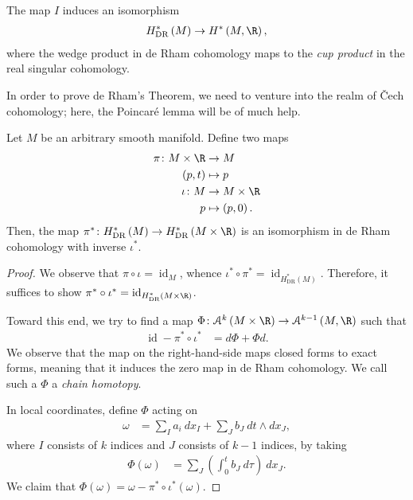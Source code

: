 \documentclass[10pt]{mypackage}
\begin{document}
\begin{theorem}
  The map $I$ induces an isomorphism
  \begin{align*}
    H^{\ast}_{\operatorname{DR}}\left( M \right)\rightarrow H^{\ast}\left( M,\R \right),
  \end{align*}
  where the wedge product in de Rham cohomology maps to the \textit{cup product} in the real singular cohomology.
\end{theorem}
In order to prove de Rham's Theorem, we need to venture into the realm of \v{C}ech cohomology; here, the Poincaré lemma will be of much help.
\begin{theorem}
  Let $M$ be an arbitrary smooth manifold. Define two maps
  \begin{align*}
    \pi\colon M\times \R&\rightarrow M\\
    \left( p,t \right) &\mapsto p\\
    \iota\colon M&\rightarrow M\times \R\\
    p &\mapsto \left( p,0 \right).
  \end{align*}
  Then, the map $\pi^{\ast}\colon H^{\ast}_{\operatorname{DR}}\left( M \right)\rightarrow H^{\ast}_{\operatorname{DR}}\left( M\times \R \right)$ is an isomorphism in de Rham cohomology with inverse $\iota^{\ast}$.
\end{theorem}
\begin{proof}
  We observe that $\pi\circ \iota = \operatorname{id}_M$, whence $\iota^{\ast}\circ \pi^{\ast} = \operatorname{id}_{H^{\ast}_{\operatorname{DR}}(M)}$. Therefore, it suffices to show $\pi^{\ast}\circ \iota^{\ast} = \operatorname{id}_{H^{\ast}_{\operatorname{DR}}\left( M\times \R \right)}$.\newline

  Toward this end, we try to find a map $\Phi\colon\mathcal{A}^{k}\left( M\times \R \right)\rightarrow \mathcal{A}^{k-1}\left( M,\R \right)$ such that
  \begin{align*}
    \operatorname{id} - \pi^{\ast}\circ\iota^{\ast} &= d\Phi + \Phi d.
  \end{align*}
  We observe that the map on the right-hand-side maps closed forms to exact forms, meaning that it induces the zero map in de Rham cohomology. We call such a $\Phi$ a \textit{chain homotopy}.\newline

  In local coordinates, define $\Phi$ acting on
  \begin{align*}
    \omega &= \sum_{I} a_i\:dx_I + \sum_{J} b_J\:dt\wedge dx_J,
  \end{align*}
  where $I$ consists of $k$ indices and $J$ consists of $k-1$ indices, by taking
  \begin{align*}
    \Phi\left(\omega\right) &= \sum_{J} \left( \int_{0}^{t} b_J\:d\tau \right)\:dx_J.
  \end{align*}
  We claim that $\Phi(\omega) = \omega - \pi^{\ast}\circ \iota^{\ast}\left( \omega \right)$. 
\end{proof}
\end{document}
